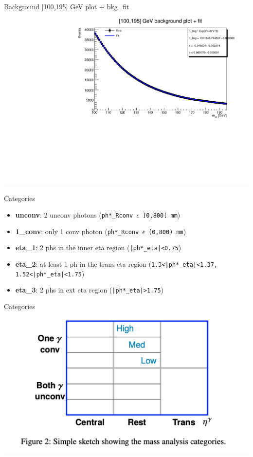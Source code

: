 \documentclass[10pt,UKenglish, leqno, xcolor = dvipsnames]{beamer}
\begin{document}
		\begin{frame}{Background [100,195] GeV plot + bkg\_fit}
			\vfill
			\includegraphics[width=1.\textwidth]{../images/week_9/background_100_195GeV_fit.pdf}
			\vfill
		\end{frame}
	
		\begin{frame}{Categories}
			\vfill
			\begin{itemize}
				\item \textbf{unconv}: 2 unconv photons (\texttt{ph*\_Rconv $\epsilon$ ]0,800[ mm})
				\item \textbf{1\_conv}: only 1 conv photon (\texttt{ph*\_Rconv $\epsilon$ (0,800) mm})
				\item \textbf{eta\_1}: 2 phs in the inner eta region (\texttt{|ph*\_eta|<0.75})
				\item \textbf{eta\_2}: at least 1 ph in the trans eta region  (\texttt{1.3<|ph*\_eta|<1.37, 1.52<|ph*\_eta|<1.75})
				\item \textbf{eta\_3}: 2 phs in ext eta region (\texttt{|ph*\_eta|>1.75})
			\end{itemize}
			\vfill
		\end{frame}
	
		\begin{frame}{Categories}
			\vfill
			\includegraphics[width=1.\textwidth]{../images/week_9/category.png}
			\vfill
		\end{frame}
	
\end{document}
